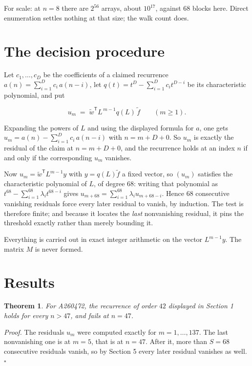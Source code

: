 \documentclass[11pt]{article}
\newtheorem{theorem}{Theorem}
\theoremstyle{definition}
\begin{document}
For scale: at $n = 8$ there are $2^{56}$ arrays, about $10^{17}$, against $68$ blocks here. Direct enumeration settles nothing at that size; the walk count does.

\section{The decision procedure}

Let $c_1,\dots,c_D$ be the coefficients of a claimed recurrence $a(n) = \sum_{i=1}^{D} c_i\,a(n-i)$, let $q(t) = t^{D} - \sum_{i=1}^{D} c_i t^{D-i}$ be its characteristic polynomial, and put

\[u_m \;=\; \tilde w^{\mathsf T} L^{\,m-1} q(L)\,\tilde f \qquad (m \ge 1).\]

Expanding the powers of $L$ and using the displayed formula for $a$, one gets $u_m = a(n) - \sum_{i=1}^{D} c_i\,a(n-i)$ with $n = m + D + 0$. So $u_m$ is exactly the residual of the claim at $n = m + D + 0$, and the recurrence holds at an index $n$ if and only if the corresponding $u_m$ vanishes.

Now $u_m = \tilde w^{\mathsf T} L^{m-1} y$ with $y = q(L)\tilde f$ a fixed vector, so $(u_m)$ satisfies the characteristic polynomial of $L$, of degree $68$: writing that polynomial as $t^{68} - \sum_{i=1}^{68} \lambda_i t^{68-i}$ gives $u_{m+68} = \sum_{i=1}^{68} \lambda_i u_{m+68-i}$. Hence $68$ consecutive vanishing residuals force every later residual to vanish, by induction. The test is therefore finite; and because it locates the {\itshape last} nonvanishing residual, it pins the threshold exactly rather than merely bounding it.

Everything is carried out in exact integer arithmetic on the vector $L^{m-1}y$. The matrix $M$ is never formed.

\section{Results}

\begin{theorem} For A260472, the recurrence of order $42$ displayed in Section 1 holds for every $n > 47$, and fails at $n = 47$.\end{theorem}

{\itshape Proof.} The residuals $u_m$ were computed exactly for $m = 1,\dots,137$. The last nonvanishing one is at $m = 5$, that is at $n = 47$. After it, more than $S = 68$ consecutive residuals vanish, so by Section 5 every later residual vanishes as well. $\square$
\end{document}
